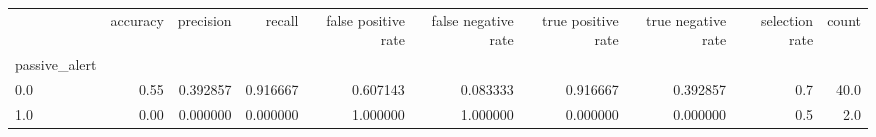 \begin{tabular}{lrrrrrrrrr}
\toprule
{} &  accuracy &  precision &    recall &  false positive rate &  false negative rate &  true positive rate &  true negative rate &  selection rate &  count \\
passive\_alert &           &            &           &                      &                      &                     &                     &                 &        \\
\midrule
0.0           &      0.55 &   0.392857 &  0.916667 &             0.607143 &             0.083333 &            0.916667 &            0.392857 &             0.7 &   40.0 \\
1.0           &      0.00 &   0.000000 &  0.000000 &             1.000000 &             1.000000 &            0.000000 &            0.000000 &             0.5 &    2.0 \\
\bottomrule
\end{tabular}
